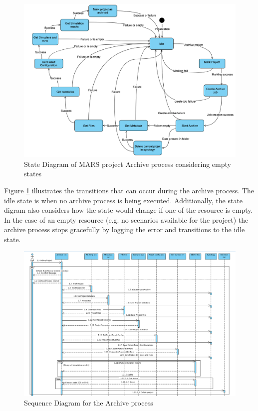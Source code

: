 \begin{figure}[H]
    \centering \includegraphics[scale=0.45]{grafiken/stateArchive.png}
    \caption{State Diagram of MARS project Archive process considering empty states}
    \label{fig:stateArchive}
\end{figure}

Figure \ref{fig:stateArchive} illustrates the transitions that can occur during the archive process. The idle state is when no archive process
is being executed. Additionally, the state digram also considers
how the state would change if one of the resource is empty. In the case of an empty resource (e.g. no scenarios available for the project) the archive
process stops gracefully by logging the error and transitions to the idle state. 

\begin{figure}[H]
    \centering \includegraphics[scale=0.5, angle=90, origin=c]{grafiken/sequenceArchive.png}
    \caption{Sequence Diagram for the Archive process}
    \label{fig:sequenceArchive}
\end{figure}

